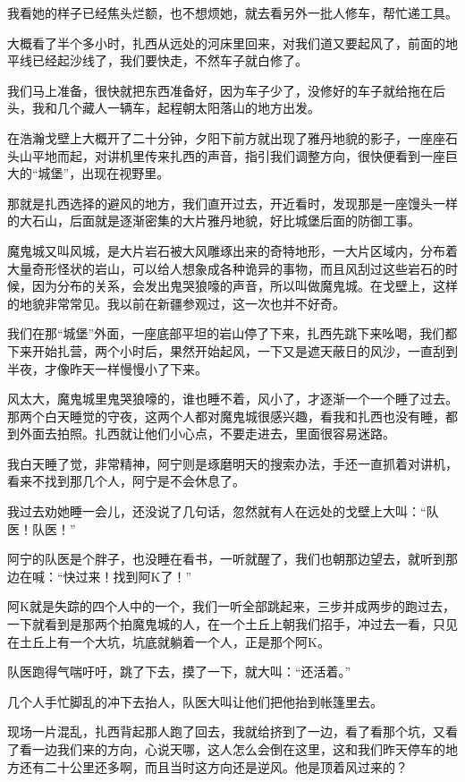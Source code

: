 我看她的样子已经焦头烂额，也不想烦她，就去看另外一批人修车，帮忙递工具。

大概看了半个多小时，扎西从远处的河床里回来，对我们道又要起风了，前面的地平线已经起沙线了，我们要快走，不然车子就白修了。

我们马上准备，很快就把东西准备好，因为车子少了，没修好的车子就给拖在后头，我和几个藏人一辆车，起程朝太阳落山的地方出发。

在浩瀚戈壁上大概开了二十分钟，夕阳下前方就出现了雅丹地貌的影子，一座座石头山平地而起，对讲机里传来扎西的声音，指引我们调整方向，很快便看到一座巨大的“城堡”，出现在视野里。

那就是扎西选择的避风的地方，我们直开过去，开近看时，发现那是一座馒头一样的大石山，后面就是逐渐密集的大片雅丹地貌，好比城堡后面的防御工事。

魔鬼城又叫风城，是大片岩石被大风雕琢出来的奇特地形，一大片区域内，分布着大量奇形怪状的岩山，可以给人想象成各种诡异的事物，而且风刮过这些岩石的时候，因为分布的关系，会发出鬼哭狼嚎的声音，所以叫做魔鬼城。在戈壁上，这样的地貌非常常见。我以前在新疆参观过，这一次也并不好奇。

我们在那“城堡”外面，一座底部平坦的岩山停了下来，扎西先跳下来吆喝，我们都下来开始扎营，两个小时后，果然开始起风，一下又是遮天蔽日的风沙，一直刮到半夜，才像昨天一样慢慢小了下来。

风太大，魔鬼城里鬼哭狼嚎的，谁也睡不着，风小了，才逐渐一个一个睡了过去。那两个白天睡觉的守夜，这两个人都对魔鬼城很感兴趣，看我和扎西也没有睡，都到外面去拍照。扎西就让他们小心点，不要走进去，里面很容易迷路。

我白天睡了觉，非常精神，阿宁则是琢磨明天的搜索办法，手还一直抓着对讲机，看来不找到那几个人，阿宁是不会休息了。

我过去劝她睡一会儿，还没说了几句话，忽然就有人在远处的戈壁上大叫：“队医！队医！”

阿宁的队医是个胖子，也没睡在看书，一听就醒了，我们也朝那边望去，就听到那边在喊：“快过来！找到阿K了！”

阿K就是失踪的四个人中的一个，我们一听全部跳起来，三步并成两步的跑过去，一下就看到是那两个拍魔鬼城的人，在一个土丘上朝我们招手，冲过去一看，只见在土丘上有一个大坑，坑底就躺着一个人，正是那个阿K。

队医跑得气喘吁吁，跳了下去，摸了一下，就大叫：“还活着。”

几个人手忙脚乱的冲下去抬人，队医大叫让他们把他抬到帐篷里去。

现场一片混乱，扎西背起那人跑了回去，我就给挤到了一边，看了看那个坑，又看了看一边我们来的方向，心说天哪，这人怎么会倒在这里，这和我们昨天停车的地方还有二十公里还多啊，而且当时这方向还是逆风。他是顶着风过来的？

